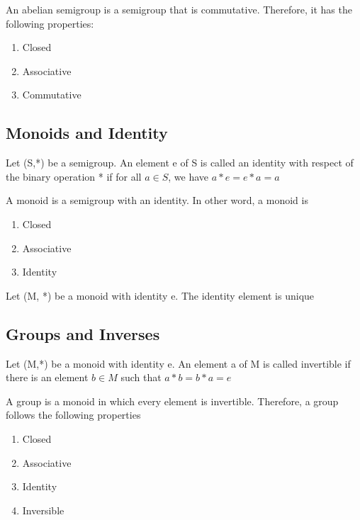 \documentclass{article}
\begin{document}
\begin{definition}
    An abelian semigroup is a semigroup that is commutative. Therefore, it has the
    following properties:
    \begin{enumerate}
	\item Closed
	\item Associative
	\item Commutative
    \end{enumerate}
\end{definition}

\subsection{Monoids and Identity}

\begin{definition}[Identity]
    Let (S,*) be a semigroup. An element e of S is called an identity with respect
    of the binary operation * if for all \( a \in S \), we have \( a * e = e * a = a \)
\end{definition}

\begin{definition}[Monoid]
    A monoid is a semigroup with an identity. In other word, a monoid is
    \begin{enumerate}
	\item Closed
	\item Associative
	\item Identity
    \end{enumerate}
\end{definition}

\begin{theorem}
    Let (M, *) be a monoid with identity e. The identity element is unique
\end{theorem}

\subsection{Groups and Inverses}

\begin{definition}[Inverse]
    Let (M,*) be a monoid with identity e. An element a of M is called invertible
    if there is an element \( b \in M \) such that \( a * b = b * a = e \)
\end{definition}

\begin{definition}[Group]
    A group is a monoid in which every element is invertible. Therefore, a group
    follows the following properties
    \begin{enumerate}
	\item Closed
	\item Associative
	\item Identity
	\item Inversible
    \end{enumerate}
\end{definition}
\end{document}
